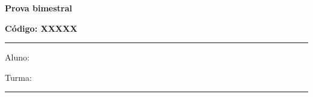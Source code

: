 \documentclass[12pt, addpoints]{exam}
\begin{document}
        
\begin{minipage}[l]{0.5\linewidth}
    \begin{flushleft}
        {\bf \Large Prova bimestral}
    \end{flushleft}
\end{minipage}
\begin{minipage}[r]{0.5\linewidth}
    \begin{flushright}
        {\bf \Large Código: XXXXX}
    \end{flushright}
\end{minipage}
\vspace{1cm} \hrule \vspace{0.5cm}
\begin{minipage}{0.70\linewidth}
    Aluno:
\end{minipage}
\begin{minipage}{0.25\linewidth}
    Turma:
\end{minipage}
\vspace{0.5cm} \hrule \vspace{0.5cm}
\end{document}
